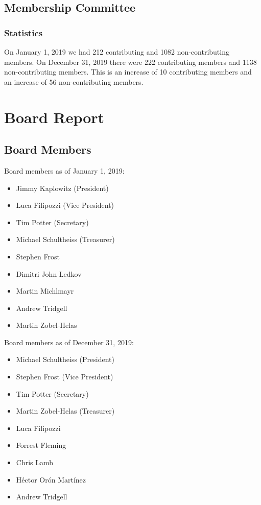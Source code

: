 \documentclass[a4paper]{report}
\begin{document}
\section{Membership Committee}

\subsection{Statistics}

On January 1, 2019 we had 212 contributing and 1082 non-contributing
members.  On December 31, 2019 there were 222 contributing members and
1138 non-contributing members.  This is an increase of 10 contributing
members and an increase of 56 non-contributing members.

\chapter{Board Report}
\section{Board Members}

Board members as of January 1, 2019:

\begin{itemize}
\item Jimmy Kaplowitz (President)
\item Luca Filipozzi (Vice President)
\item Tim Potter (Secretary)
\item Michael Schultheiss (Treasurer)
\item Stephen Frost
\item Dimitri John Ledkov
\item Martin Michlmayr
\item Andrew Tridgell
\item Martin Zobel-Helas
\end{itemize}

Board members as of December 31, 2019:

\begin{itemize}
\item Michael Schultheiss (President)
\item Stephen Frost (Vice President)
\item Tim Potter (Secretary)
\item Martin Zobel-Helas (Treasurer)
\item Luca Filipozzi
\item Forrest Fleming
\item Chris Lamb
\item Héctor Orón Martínez
\item Andrew Tridgell
\end{itemize}
\end{document}
